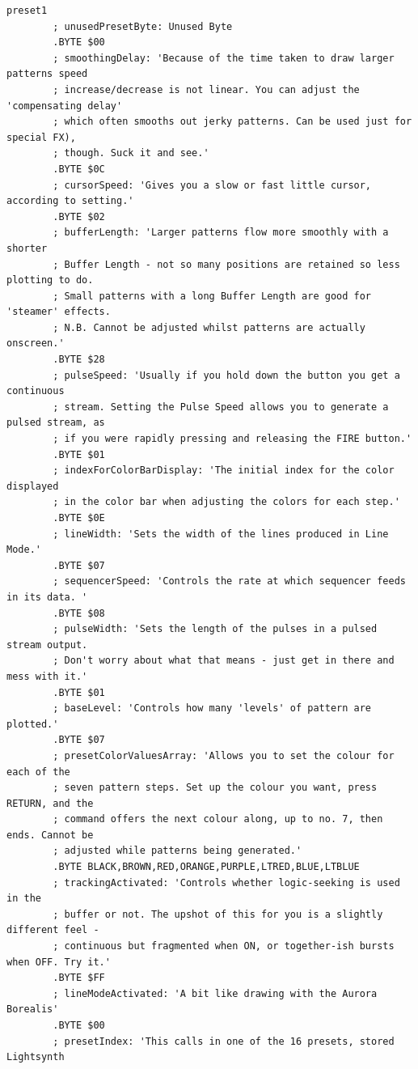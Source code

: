 \begin{lstlisting}[basicstyle=\tiny,caption=Source code for Preset 1.]
preset1
        ; unusedPresetByte: Unused Byte
        .BYTE $00
        ; smoothingDelay: 'Because of the time taken to draw larger patterns speed
        ; increase/decrease is not linear. You can adjust the 'compensating delay'
        ; which often smooths out jerky patterns. Can be used just for special FX),
        ; though. Suck it and see.'
        .BYTE $0C
        ; cursorSpeed: 'Gives you a slow or fast little cursor, according to setting.'
        .BYTE $02
        ; bufferLength: 'Larger patterns flow more smoothly with a shorter
        ; Buffer Length - not so many positions are retained so less plotting to do.
        ; Small patterns with a long Buffer Length are good for 'steamer' effects.
        ; N.B. Cannot be adjusted whilst patterns are actually onscreen.'
        .BYTE $28
        ; pulseSpeed: 'Usually if you hold down the button you get a continuous
        ; stream. Setting the Pulse Speed allows you to generate a pulsed stream, as
        ; if you were rapidly pressing and releasing the FIRE button.'
        .BYTE $01
        ; indexForColorBarDisplay: 'The initial index for the color displayed
        ; in the color bar when adjusting the colors for each step.'
        .BYTE $0E
        ; lineWidth: 'Sets the width of the lines produced in Line Mode.'
        .BYTE $07
        ; sequencerSpeed: 'Controls the rate at which sequencer feeds in its data. '
        .BYTE $08
        ; pulseWidth: 'Sets the length of the pulses in a pulsed stream output.
        ; Don't worry about what that means - just get in there and mess with it.'
        .BYTE $01
        ; baseLevel: 'Controls how many 'levels' of pattern are plotted.'
        .BYTE $07
        ; presetColorValuesArray: 'Allows you to set the colour for each of the
        ; seven pattern steps. Set up the colour you want, press RETURN, and the
        ; command offers the next colour along, up to no. 7, then ends. Cannot be
        ; adjusted while patterns being generated.'
        .BYTE BLACK,BROWN,RED,ORANGE,PURPLE,LTRED,BLUE,LTBLUE
        ; trackingActivated: 'Controls whether logic-seeking is used in the
        ; buffer or not. The upshot of this for you is a slightly different feel -
        ; continuous but fragmented when ON, or together-ish bursts when OFF. Try it.'
        .BYTE $FF
        ; lineModeActivated: 'A bit like drawing with the Aurora Borealis'
        .BYTE $00
        ; presetIndex: 'This calls in one of the 16 presets, stored Lightsynth

\end{lstlisting}
